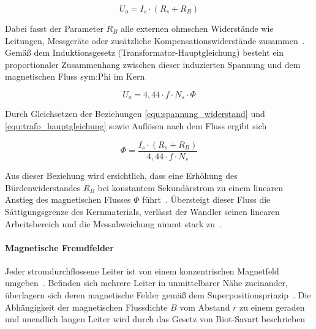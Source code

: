 \begin{equation}
    U_o = I_s \cdot (R_s + R_B)
    \label{equ:spannung_widerstand}
\end{equation}

Dabei fasst der Parameter $R_B$ alle externen ohmschen Widerstände wie Leitungen, Messgeräte oder zusätzliche Kompensationswiderstände zusammen~\cite[S.~65]{book-Technologie_Messwandler-Minkner}.
Gemäß dem Induktionsgesetz (Transformator-Hauptgleichung) besteht ein proportionaler Zusammenhang zwischen dieser induzierten Spannung und dem magnetischen Fluss \gls{sym:Phi} im Kern~\cite[S.~67]{book-Technologie_Messwandler-Minkner}

\begin{equation}
    U_o = 4,44 \cdot f \cdot N_s \cdot \Phi
    \label{equ:trafo_hauptgleichung}
\end{equation}

Durch Gleichsetzen der Beziehungen \eqref{equ:spannung_widerstand} und \eqref{equ:trafo_hauptgleichung} sowie Auflösen nach dem Fluss ergibt sich

\begin{equation}
    \Phi = \frac{I_s \cdot (R_s + R_B)}{4,44 \cdot f \cdot N_s}
    \label{eq:fluss_buerde}
\end{equation}

Aus dieser Beziehung wird ersichtlich, dass eine Erhöhung des Bürdenwiderstandes $R_B$ bei konstantem Sekundärstrom zu einem linearen Anstieg des magnetischen Flusses $\Phi$ führt~\cite[S.~67]{book-Technologie_Messwandler-Minkner}.
Übersteigt dieser Fluss die Sättigungsgrenze des Kernmaterials, verlässt der Wandler seinen linearen Arbeitsbereich und die Messabweichung nimmt stark zu~\cite[S.~73]{book-Technologie_Messwandler-Minkner}.


\paragraph{Magnetische Fremdfelder}
\label{sec:theorie_fremdfelder}

Jeder stromdurchflossene Leiter ist von einem konzentrischen Magnetfeld umgeben~\cite[S.~343]{book-Kuepfmueller_Theo_ETechnik-Mathis}.
Befinden sich mehrere Leiter in unmittelbarer Nähe zueinander, überlagern sich deren magnetische Felder gemäß dem Superpositionsprinzip~\cite[Kap.~4.5.4]{book-Physik_Ingenieure-Hering}.
Die Abhängigkeit der magnetischen Flussdichte $B$ vom Abstand $r$ zu einem geraden und unendlich langen Leiter wird durch das Gesetz von Biot-Savart beschrieben~\cite[S.~333]{book-Kuepfmueller_Theo_ETechnik-Mathis}

